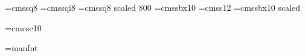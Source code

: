 \font\eightss=cmssq8
\font\eightssi=cmssqi8
\font\sixss=cmssq8 scaled 800
\font\tenssbx=cmssbx10
\font\twelvess=cmss12
\font\titlefont=cmssbx10 scaled

\font\tencsc=cmcsc10

\font\manfnt=manfnt %

\let\realtentt=\tentt
\def\tenpoint{\def\rm{\fam0\let\tentt=\realtentt\tenrm}%
  \clearance=4.175 pt
  \textfont0=\tenrm \scriptfont0=\sevenrm \scriptscriptfont0=\fiverm
  \textfont1=\teni \scriptfont1=\seveni \scriptscriptfont1=\fivei
  \textfont2=\tensy \scriptfont2=\sevensy \scriptscriptfont2=\fivesy
  \textfont3=\tenex \scriptfont3=\eightex \scriptscriptfont3=\sevenex
  \def\it{\fam\itfam\tenit}%
  \textfont\itfam=\tenit
  \def\sl{\fam\slfam\let\tentt=\tensltt\tensl}%
  \textfont\slfam=\tensl
  \def\bf{\fam\bffam\tenbf}%
  \textfont\bffam=\tenbf \scriptfont\bffam=\sevenbf
   \scriptscriptfont\bffam=\fivebf
  \def\tt{\fam\ttfam\tentt}%
  \let\sltt=\tensltt
  \textfont\ttfam=\tentt
  \scriptfont\ttfam=\seventt
  \def\oldstyle{\fam\@ne\teni}%
  \normalbaselineskip=12pt
  \def\bigfences{\textfont3=\elevenex}%
  \let\big=\tenbig
  \let\Big=\tenBig
  \let\bigg=\tenbigg
  \let\Bigg=\tenBigg
  \setbox\strutbox=\hbox{\vrule height8.5pt depth3.5pt width\z@}%
  \setbox0=\hbox{$\partial$}\setbox\ush=\hbox{\rotu0}%
  \bitmapsize=10pt
  \let\adbcfont=\eightrm
  \let\mc=\ninerm %
  \let\boldit=\tenbi
  \let\ii=\tenii
  \def\MF{{\manfnt META}\-{\manfnt FONT}}%
  \normalbaselines\rm}

\def\ninepoint{\def\rm{\fam0\ninerm}%
  \clearance=3.9125 pt
  \textfont0=\ninerm \scriptfont0=\sixrm \scriptscriptfont0=\fiverm
  \textfont1=\ninei \scriptfont1=\sixi \scriptscriptfont1=\fivei
  \textfont2=\ninesy \scriptfont2=\sixsy \scriptscriptfont2=\fivesy
  \textfont3=\nineex \scriptfont3=\sevenex \scriptscriptfont3=\sevenex
  \def\it{\fam\itfam\nineit}%
  \textfont\itfam=\nineit
  \def\sl{\fam\slfam\let\ninett=\ninesltt\ninesl}%
  \textfont\slfam=\ninesl
  \def\bf{\fam\bffam\ninebf}%
  \textfont\bffam=\ninebf \scriptfont\bffam=\sixbf
   \scriptscriptfont\bffam=\fivebf
  \def\tt{\fam\ttfam\ninett}%
  \let\sltt=\error
  \textfont\ttfam=\ninett
  \def\oldstyle{\fam\@ne\ninei}%
  \normalbaselineskip=11pt
  \def\bigfences{\textfont3=\tenex}%
  \let\big=\ninebig
  \let\Big=\nineBig
  \let\bigg=\ninebigg
  \let\Bigg=\nineBigg
  \setbox\strutbox=\hbox{\vrule height8pt depth3pt width\z@}%
  \setbox0=\hbox{$\partial$}\setbox\ush=\hbox{\rotu0}%
  \bitmapsize=9pt
  \let\adbcfont=\sevenrm
  \let\mc=\eightrm %
  \let\boldit=\ninebi
  \let\ii=\error
  \def\MF{{\manfnt hijk}\-{\manfnt lmnj}}%
  \normalbaselines\rm}
\let\normalninepoint=\ninepoint
\def\flexninepoint{\normalninepoint
  \advance\baselineskip 0pt plus .2pt minus .25pt}

